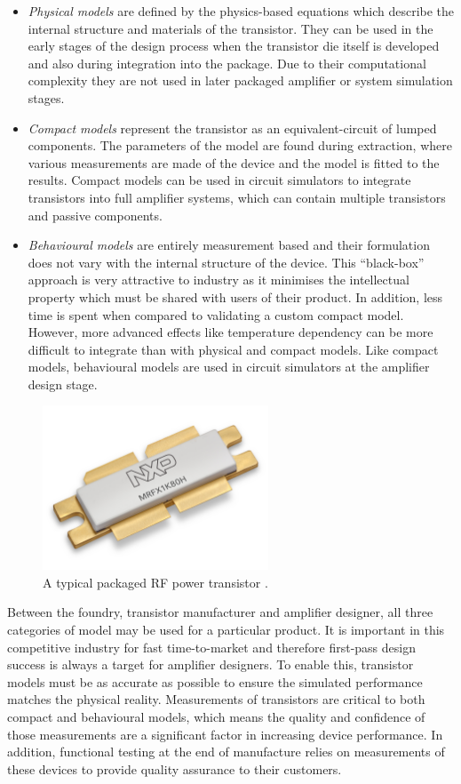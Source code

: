 \documentclass[../thesis/thesis.tex]{subfiles}
\begin{document}
\begin{itemize}
	\item \emph{Physical models} are defined by the physics-based equations which describe the internal structure and materials of the transistor. They can be used in the early stages of the design process when the transistor die itself is developed and also during integration into the package. Due to their computational complexity they are not used in later packaged amplifier or system simulation stages.
	\item \emph{Compact models} represent the transistor as an equivalent-circuit of lumped components. The parameters of the model are found during extraction, where various measurements are made of the device and the model is fitted to the results. Compact models can be used in circuit simulators to integrate transistors into full amplifier systems, which can contain multiple transistors and passive components.
	\item \emph{Behavioural models} are entirely measurement based and their formulation does not vary with the internal structure of the device. This ``black-box'' approach is very attractive to industry as it minimises the intellectual property which must be shared with users of their product. In addition, less time is spent when compared to validating a custom compact model. However, more advanced effects like temperature dependency can be more difficult to integrate than with physical and compact models. Like compact models, behavioural models are used in circuit simulators at the amplifier design stage.
\end{itemize}

\begin{figure}
	\centering
	\includegraphics[width=0.6\textwidth]{ch1_rfpa}
	\caption{A typical packaged RF power transistor \cite{nxp_pic}.}
	\label{ch1_fig_rfpa}
\end{figure}

Between the foundry, transistor manufacturer and amplifier designer, all three categories of model may be used for a particular product. It is important in this competitive industry for fast time-to-market and therefore first-pass design success is always a target for amplifier designers. To enable this, transistor models must be as accurate as possible to ensure the simulated performance matches the physical reality. Measurements of transistors are critical to both compact and behavioural models, which means the quality and confidence of those measurements are a significant factor in increasing device performance. In addition, functional testing at the end of manufacture relies on measurements of these devices to provide quality assurance to their customers.
\end{document}
